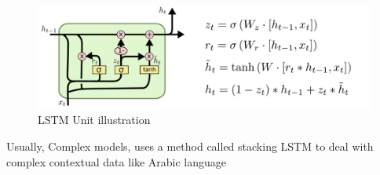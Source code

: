 \begin{figure}[ht]
    \centering
    \includegraphics[scale=0.7]{Images/LSTM3-var-GRU.png}
    \caption{LSTM Unit illustration}
    \label{fig:lstm}
\end{figure}

Usually, Complex models, uses a method called stacking LSTM to deal with complex contextual data like Arabic language
